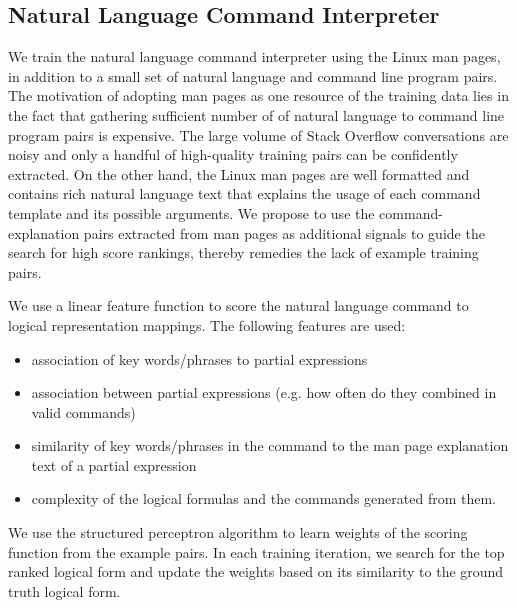 \subsection{Natural Language Command Interpreter}
\label{subsec:parser}
We train the natural language command interpreter using the Linux man pages, in addition to a small set of natural language and command line program pairs. The motivation of adopting man pages as one resource of the training data lies in the fact that gathering sufficient number of of natural language to command line program pairs is expensive. The large volume of Stack Overflow conversations are noisy and only a handful of high-quality training pairs can be confidently extracted. On the other hand, the Linux man pages are well formatted and contains rich natural language text that explains the usage of each command template and its possible arguments. We propose to use the command-explanation pairs extracted from man pages as additional signals to guide the search for high score rankings, thereby remedies the lack of example training pairs.

We use a linear feature function to score the natural language command to logical representation mappings. The following features are used:
\begin{itemize}\itemsep-1pt
	\item association of key words/phrases to partial expressions
	\item association between partial expressions (e.g. how often do they combined in valid commands)
	\item similarity of key words/phrases in the command to the man page explanation text of a partial expression
	\item complexity of the logical formulas and the commands generated from them.
\end{itemize}
We use the structured perceptron algorithm to learn weights of the scoring function from the example pairs. In each training iteration, we search for the top ranked logical form and update the weights based on its similarity to the ground truth logical form.
